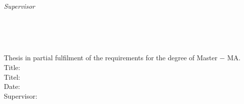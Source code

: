 \begin{titlepage}
	\vfill
	\begin{minipage}[t]{.27\textwidth}
		\raggedleft
		\textit{Supervisor}
	\end{minipage}
	\hspace*{15pt}
	\begin{minipage}[t]{.65\textwidth}
		\thesisFirstSupervisor
	\end{minipage} \\[10mm]

	\thesisDate \\

\end{titlepage}


\hfill
\vfill
{
	\small
	\textbf{\thesisName} \\
	Thesis in partial fulfilment of the requirements for the degree of Master − MA. \\
	Title: \thesisTitle \\
	Titel: \thesisTitleDE \\
	Date: \thesisDate \\
	Supervisor: \thesisFirstSupervisor \\[1.5em]
	\textbf{\thesisUniversity} \\
	\thesisUniversityInstitute \\
	\thesisUniversityStreetAddress \\
	\thesisUniversityPostalCode\ \thesisUniversityCity
}
